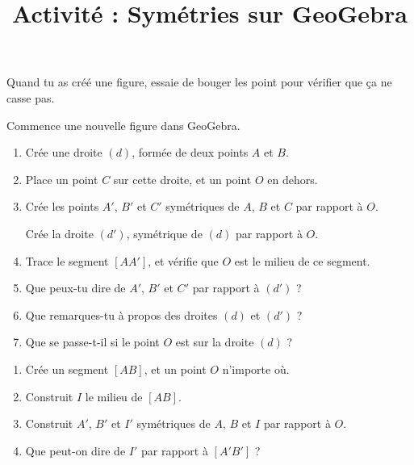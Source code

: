 \documentclass[a4paper,12pt]{article}
\title{Activité : Symétries sur GeoGebra}
\date{}
\author{}
\makeatletter
\renewcommand{\maketitle}{%
	\begin{center}
		\LARGE
		\uline{\@title}
		\vspace{1em}
	\end{center}
}
\makeatother
\begin{document}
\maketitle

\begin{attention}
	Quand tu as créé une figure, essaie de bouger les point pour vérifier que ça ne casse pas.
\end{attention}

\begin{exercice}
	Commence une nouvelle figure dans GeoGebra.
	\begin{enumerate}
		\item Crée une droite $(d)$, formée de deux points $A$ et $B$.
		\item Place un point $C$ sur cette droite, et un point $O$ en dehors.
		\item Crée les points $A'$, $B'$ et $C'$ symétriques de $A$, $B$ et $C$ par rapport à $O$.

		      Crée la droite $(d')$, symétrique de $(d)$ par rapport à $O$.
		\item Trace le segment $[AA']$, et vérifie que $O$ est le milieu de ce segment. \vspace{2em}
		\item Que peux-tu dire de $A'$, $B'$ et $C'$ par rapport à $(d')$ ? \vspace{2em}
		\item Que remarques-tu à propos des droites $(d)$ et $(d')$ ? \vspace{2em}
		\item Que se passe-t-il si le point $O$ est sur la droite $(d)$ ? \vspace{2em}
	\end{enumerate}
\end{exercice}

\begin{exercice}
	\begin{enumerate}
		\item Crée un segment $[AB]$, et un point $O$ n'importe où.
		\item Construit $I$ le milieu de $[AB]$.
		\item Construit $A'$, $B'$ et $I'$ symétriques de $A$, $B$ et $I$ par rapport à $O$.
		\item Que peut-on dire de $I'$ par rapport à $[A'B']$ ? \vspace{2em}
	\end{enumerate}
\end{exercice}
\end{document}
